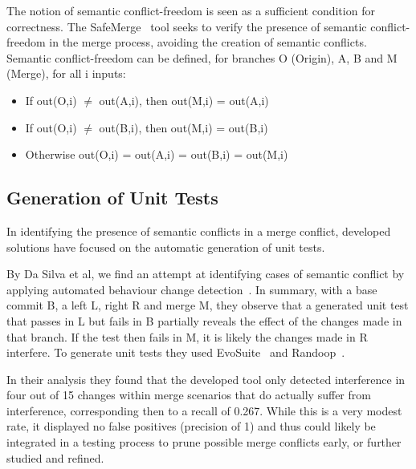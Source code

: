 The notion of semantic conflict-freedom is seen as a sufficient condition for correctness. The SafeMerge~\cite{kn:safemerge} tool seeks to verify the presence of semantic conflict-freedom in the merge process, avoiding the creation of semantic conflicts. Semantic conflict-freedom can be defined, for branches O (Origin), A, B and M (Merge), for all i inputs:
\begin{itemize}
  \item If out(O,i) $\neq$ out(A,i), then out(M,i) = out(A,i)
  \item If out(O,i) $\neq$ out(B,i), then out(M,i) = out(B,i)
  \item Otherwise out(O,i) = out(A,i) = out(B,i) = out(M,i)
\end{itemize}

\subsection{Generation of Unit Tests}


In identifying the presence of semantic conflicts in a merge conflict, developed solutions have focused on the automatic generation of unit tests.

By Da Silva et al, we find an attempt at identifying cases of semantic conflict by applying automated behaviour change detection~\cite{kn:leuson}. In summary, with a base commit B, a left L, right R and merge M, they observe that a generated unit test that passes in L but fails in B partially reveals the effect of the changes made in that branch. If the test then fails in M, it is likely the changes made in R interfere. To generate unit tests they used EvoSuite~\cite{kn:evosuite} and Randoop~\cite{kn:randoop}.

In their analysis they found that the developed tool only detected interference in four out of 15 changes within merge scenarios that do actually suffer from interference, corresponding then to a recall of 0.267. While this is a very modest rate, it displayed no false positives (precision of 1) and thus could likely be integrated in a testing process to prune possible merge conflicts early, or further studied and refined.

